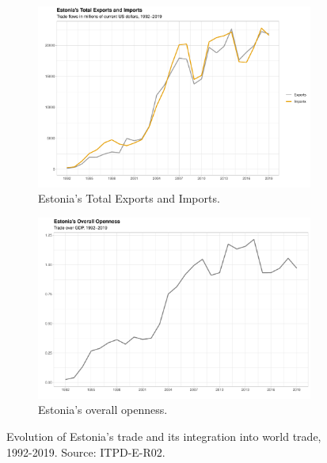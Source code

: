 \documentclass[a4paper,10pt]{article}
\begin{document}
\begin{figure}[!ht]
	\centering
	\begin{subfigure}{0.49\textwidth}
		\centering 
		\includegraphics[width=1\textwidth]{EST_total_trade.pdf}
		\caption{Estonia's Total Exports and Imports.}
		\label{fig:1.1}
	\end{subfigure}
	\hfill
	\begin{subfigure}{0.49\textwidth}
		\centering
		\includegraphics[width=1\textwidth]{EST_overall_openness.pdf}
		\caption{Estonia's overall openness.}
		\label{fig:1.2}
	\end{subfigure}
	\caption{Evolution of Estonia's trade and its integration into world trade, 1992-2019. Source: ITPD-E-R02.}
	\label{fig:1}
\end{figure}
\end{document}
